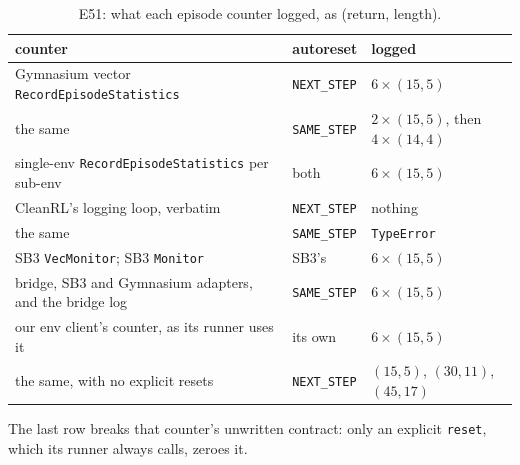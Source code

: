 \documentclass[conference]{IEEEtran}
\begin{document}
\begin{table}[H]
\centering
\caption{E51: what each episode counter logged, as (return, length).}
\label{tab:e51}
\footnotesize
\setlength{\tabcolsep}{3pt}
\begin{tabular}{@{}L{0.5\columnwidth}lL{0.27\columnwidth}@{}}
\toprule
counter & autoreset & logged \\
\midrule
Gymnasium vector \texttt{RecordEpisodeStatistics} & \texttt{NEXT\_STEP} & $6\times(15,5)$ \\
\quad the same & \texttt{SAME\_STEP} & $2\times(15,5)$, then $4\times(14,4)$ \\
single-env \texttt{RecordEpisodeStatistics} per sub-env & both & $6\times(15,5)$ \\
CleanRL's logging loop, verbatim & \texttt{NEXT\_STEP} & nothing \\
\quad the same & \texttt{SAME\_STEP} & \texttt{TypeError} \\
SB3 \texttt{VecMonitor}; SB3 \texttt{Monitor} & SB3's & $6\times(15,5)$ \\
bridge, SB3 and Gymnasium adapters, and the bridge log & \texttt{SAME\_STEP} & $6\times(15,5)$ \\
our env client's counter, as its runner uses it & its own & $6\times(15,5)$ \\
\quad the same, with no explicit resets & \texttt{NEXT\_STEP} & $(15,5)$, $(30,11)$, $(45,17)$ \\
\bottomrule
\end{tabular}
\end{table}

The last row breaks that counter's unwritten contract: only an
explicit \texttt{reset}, which its runner always calls, zeroes it.
\end{document}
